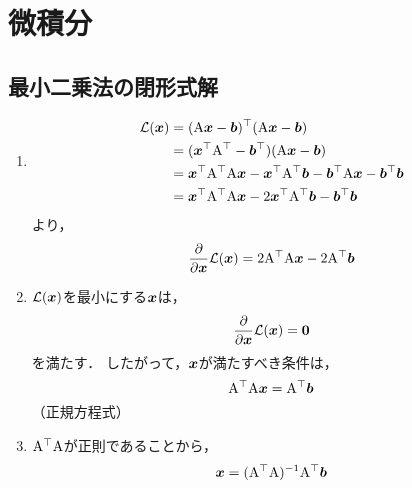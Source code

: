 \section{微積分}

\subsection{最小二乗法の閉形式解}
  \begin{enumerate}[label=(\roman*)]
    \item
      \begin{align}
        \mathcal{L}(\boldsymbol{x}) &= (\mathrm{A}\boldsymbol{x} - \boldsymbol{b})^\top (\mathrm{A}\boldsymbol{x} - \boldsymbol{b}) \\
          &= (\boldsymbol{x}^\top\mathrm{A}^\top - \boldsymbol{b}^\top) (\mathrm{A}\boldsymbol{x} - \boldsymbol{b}) \\
          &= \boldsymbol{x}^\top\mathrm{A}^\top\mathrm{A}\boldsymbol{x} - \boldsymbol{x}^\top\mathrm{A}^\top\boldsymbol{b} - \boldsymbol{b}^\top\mathrm{A}\boldsymbol{x} - \boldsymbol{b}^\top\boldsymbol{b} \\
          &= \boldsymbol{x}^\top\mathrm{A}^\top\mathrm{A}\boldsymbol{x} - 2\boldsymbol{x}^\top\mathrm{A}^\top\boldsymbol{b} - \boldsymbol{b}^\top\boldsymbol{b}
      \end{align}
      より，
      \begin{equation}
        \frac{\partial}{\partial \boldsymbol{x}} \mathcal{L}(\boldsymbol{x}) = 2 \mathrm{A}^\top\mathrm{A}\boldsymbol{x} - 2\mathrm{A}^\top\boldsymbol{b}
      \end{equation}
    \item $\mathcal{L}(\boldsymbol{x})$を最小にする$\boldsymbol{x}$は，
      \begin{equation}
        \frac{\partial}{\partial \boldsymbol{x}} \mathcal{L}(\boldsymbol{x}) = \boldsymbol{0}
      \end{equation}
      を満たす．
      したがって，$\boldsymbol{x}$が満たすべき条件は，
      \begin{equation}
        \mathrm{A}^\top\mathrm{A}\boldsymbol{x} = \mathrm{A}^\top\boldsymbol{b}
      \end{equation}
      （正規方程式）
    \item $\mathrm{A}^\top\mathrm{A}$が正則であることから，
      \begin{equation}
        \boldsymbol{x} = (\mathrm{A}^\top\mathrm{A})^{-1}\mathrm{A}^\top\boldsymbol{b}
      \end{equation}
  \end{enumerate}

\clearpage

